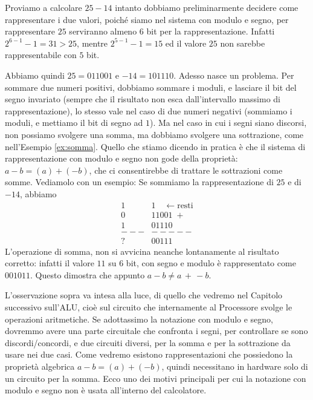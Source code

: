 \begin{ex} Proviamo a calcolare $25 - 14$ intanto dobbiamo preliminarmente decidere come rappresentare i due valori, poiché siamo nel sistema con modulo e segno, per rappresentare $25$ serviranno almeno $6$ bit per la rappresentazione. Infatti $2^{6-1}-1 = 31 > 25$, mentre $2^{5-1}-1 = 15$ ed il valore $25$ non sarebbe rappresentabile con $5$ bit. 

Abbiamo quindi $25 = 011001$ e  $-14 = 101110$. Adesso nasce un problema. 
Per sommare due numeri positivi, dobbiamo sommare i moduli, e lasciare il bit
del segno invariato (sempre che il risultato non esca dall'intervallo massimo
di rappresentazione), lo stesso vale nel caso di due numeri negativi (sommiamo
i moduli, e mettiamo il bit di segno ad $1$). Ma nel caso in cui i segni siano
discorsi, non possiamo svolgere una somma, ma dobbiamo svolgere una sottrazione,
come nell'Esempio \ref{ex:somma}. Quello che stiamo dicendo in pratica è che
il sistema di rappresentazione con modulo e segno non gode della proprietà: $a-b = (a)+(-b)$, che ci consentirebbe di trattare le sottrazioni come somme. Vediamolo con un esempio:
Se sommiamo la rappresentazione di $25$ e di $-14$, abbiamo
\begin{align*}
	    1&1 \quad \leftarrow\text{resti}\\ 
	    0&11001 \;+\\
	    1&01110\\
      ---&-----\\
	    ?&00111
\end{align*} L'operazione di somma, non si avvicina neanche lontanamente
al risultato corretto: infatti il valore $11$ su $6$ bit, con segno e modulo è rappresentato come $001011$. Questo dimostra che appunto $a-b \neq a \,+\, -b$.
\end{ex}

L'osservazione sopra va intesa alla luce, di quello che vedremo nel Capitolo successivo sull'ALU, cioè sul circuito che internamente al Processore svolge le
operazioni aritmetiche. Se adottassimo la notazione con modulo e segno, dovremmo avere una parte circuitale che confronta i segni, per controllare se
sono discordi/concordi, e due circuiti diversi, per la somma e per la sottrazione da usare nei due casi. Come vedremo esistono
rappresentazioni che possiedono la proprietà algebrica $a-b = (a)+(-b)$,
quindi necessitano in hardware solo di un circuito per la somma. Ecco
uno dei motivi principali per cui la notazione con modulo e segno non è usata all'interno del calcolatore.

